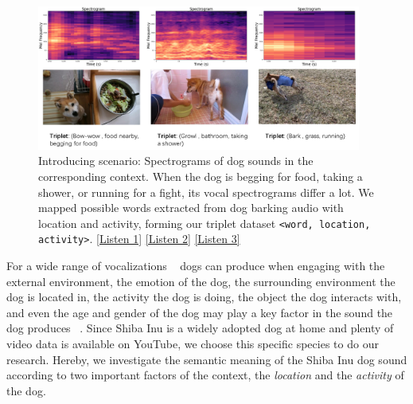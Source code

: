 \begin{figure}[t]
	\centering
	\includegraphics[width=0.95\textwidth]{images/intro.png}
	\caption{Introducing scenario: Spectrograms of dog sounds in the corresponding context. When the dog is begging for food, taking a shower, or running for a fight, its vocal spectrograms differ a lot. We mapped possible words extracted from dog barking audio with location and activity, forming our triplet dataset \texttt{<word, location, activity>}.
		\href{https://anonymous.4open.science/r/emnlp2023-937942/audios_in_paper/fig11.wav}{[Listen 1]}
		\href{https://anonymous.4open.science/r/emnlp2023-937942/audios_in_paper/fig12.wav}{[Listen 2]}
		\href{https://anonymous.4open.science/r/emnlp2023-937942/audios_in_paper/fig13.wav}{[Listen 3]}
	} %
	\label{fig:intropic}
\end{figure}

For a wide range of vocalizations ~\cite{yeon2007vocal} dogs can produce when engaging with the external environment, the emotion of the dog, the surrounding environment the dog is located in, the activity the dog is doing, the object the dog interacts with, and even the age and gender of the dog may play a key factor in the sound the dog produces ~\cite{pongracz2005human,molnar2009dogs}.
Since Shiba Inu is a widely adopted dog at home and plenty of video data is available on YouTube, we choose this specific species to do our research. Hereby, we investigate the semantic meaning of the Shiba Inu dog sound according to two important factors of the context,  the \textit{location} and the \textit{activity} of the dog. 

 



